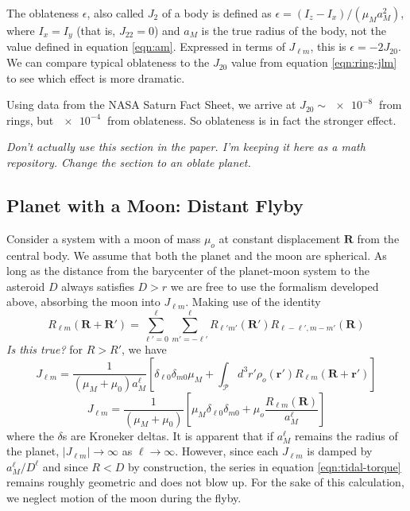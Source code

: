 \documentclass[11pt]{article}
\newcommand{\brackets}[1]{\left[ #1 \right]}
\newcommand{\jtd}[1]{{\color{red}\textit{#1}}}
\begin{document}
The oblateness $\epsilon$, also called $J_2$ of a body is defined as $\epsilon = (I_z - I_x)/(\mu_M a_M^2)$, where $I_x = I_y$ (that is, $J_{22} = 0$) and $a_M$ is the true radius of the body, not the value defined in equation \ref{eqn:am}. Expressed in terms of $J_{\ell m}$, this is $\epsilon = -2J_{20}$. We can compare typical oblateness to the $J_{20}$ value from equation \ref{eqn:ring-jlm} to see which effect is more dramatic.

Using data from the NASA Saturn Fact Sheet, we arrive at $J_{20}\sim \SI{e-8}{}$ from rings, but $\SI{e-4}{}$ from oblateness. So oblateness is in fact the stronger effect.

\jtd{Don't actually use this section in the paper. I'm keeping it here as a math repository. Change the section to an oblate planet.}

\subsection{Planet with a Moon: Distant Flyby}
Consider a system with a moon of mass $\mu_{o}$ at constant displacement $\bm R$ from the central body. We assume that both the planet and the moon are spherical. As long as the distance from the barycenter of the planet-moon system to the asteroid $D$ always satisfies $D>r$ we are free to use the formalism developed above, absorbing the moon into $J_{\ell m}$. Making use of the identity \cite{Gelderen1998TheSO}
\begin{equation}
R_{\ell m}(\bm R + \bm R') = \sum_{\ell' = 0}^\ell \sum_{m'=-\ell'}^\ell R_{\ell' m'}(\bm R') R_{\ell-\ell', m-m'}(\bm R)
\end{equation}
\jtd{Is this true?}
for $R > R'$, we have
\begin{equation}
J_{\ell m} = \frac{1}{(\mu_M+\mu_0) a_M^\ell}\brackets{\delta_{\ell 0}\delta_{m0}\mu_M + \int_\mathcal{P} d^3 r' \rho_o(\bm r') R_{\ell m}(\bm R + \bm r')}
\end{equation}
\begin{equation}
J_{\ell m} = \frac{1}{(\mu_M+\mu_0)}\brackets{\mu_M\delta_{\ell 0}\delta_{m0} + \mu_o \frac{R_{\ell m}(\bm R)}{ a_M^\ell}}
\end{equation}
where the $\delta$s are Kroneker deltas. It is apparent that if $a_M^\ell$ remains the radius of the planet, $|J_{\ell m}| \rightarrow \infty$ as $\ell \rightarrow \infty$. However, since each $J_{\ell m}$ is damped by $a_M^\ell / D^\ell$ and since $R < D$ by construction, the series in equation \ref{eqn:tidal-torque} remains roughly geometric and does not blow up. For the sake of this calculation, we neglect motion of the moon during the flyby.
\end{document}
